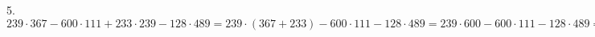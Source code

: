 5.$239\cdot367-600\cdot111+233\cdot239-128\cdot489=239\cdot(367+233)-600\cdot111-128\cdot489=239\cdot600-600\cdot111-128\cdot489=600\cdot(239-111)-128\cdot489=600\cdot128-
128\cdot489=128\cdot(600-489)=128\cdot111=14208.$\\
